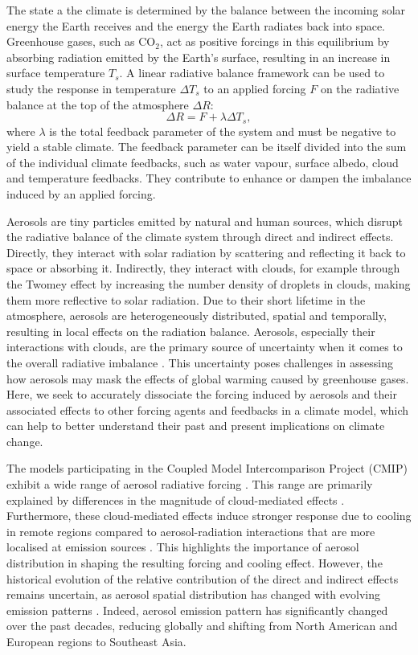 \documentclass[draft]{agujournal2019}
\begin{document}
      The state a the climate is determined by the balance between the incoming solar energy the Earth receives and the energy the Earth radiates back into space. Greenhouse gases, such as CO$_2$, act as positive forcings in this equilibrium by absorbing radiation emitted by the Earth's surface, resulting in an increase in surface temperature $T_s$. A linear radiative balance framework can be used to study the response in temperature $\Delta T_s$ to an applied forcing $F$ on the radiative balance at the top of the atmosphere $\Delta R$:
      \begin{equation}\label{eq:eq1}
            \Delta R = F + \lambda \Delta T_s,
      \end{equation}
      where $\lambda$ is the total feedback parameter of the system and must be negative to yield a stable climate. The feedback parameter can be itself divided into the sum of the individual climate feedbacks, such as water vapour, surface albedo, cloud and temperature feedbacks. They contribute to enhance or dampen the imbalance induced by an applied forcing.

      Aerosols are tiny particles emitted by natural and human sources, which disrupt the radiative balance of the climate system through direct and indirect effects. Directly, they interact with solar radiation by scattering and reflecting it back to space or absorbing it. Indirectly, they interact with clouds, for example through the Twomey effect \cite{Twomey_1974} by increasing the number density of droplets in clouds, making them more reflective to solar radiation. Due to their short lifetime in the atmosphere, aerosols are heterogeneously distributed, spatial and temporally, resulting in local effects on the radiation balance.
      Aerosols, especially their interactions with clouds, are the primary source of uncertainty when it comes to the overall radiative imbalance \cite{Forster_2021}. This uncertainty poses challenges in assessing how aerosols may mask the effects of global warming caused by greenhouse gases. Here, we seek to accurately dissociate the forcing induced by aerosols and their associated effects to other forcing agents and feedbacks in a climate model, which can help to better understand their past and present implications on climate change.

      The models participating in the Coupled Model Intercomparison Project (CMIP) exhibit a wide range of aerosol radiative forcing \cite{Bellouin_2020}. This range are primarily explained by differences in the magnitude of cloud-mediated effects \cite{Fiedler_2023}. Furthermore, these cloud-mediated effects induce stronger response due to cooling in remote regions compared to aerosol-radiation interactions that are more localised at emission sources \cite{Huusko_2022}. This highlights the importance of aerosol distribution in shaping the resulting forcing and cooling effect. However, the historical evolution of the relative contribution of the direct and indirect effects remains uncertain, as aerosol spatial distribution has changed with evolving emission patterns \cite{Stevens_2015}. Indeed, aerosol emission pattern has significantly changed over the past decades, reducing globally and shifting from North American and European regions to Southeast Asia.
\end{document}
